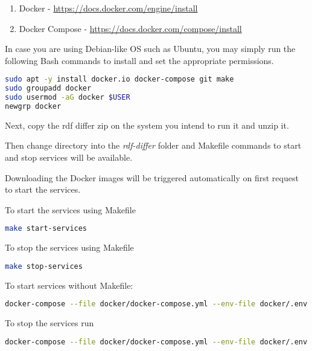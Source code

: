 \begin{enumerate}
	\item Docker - \url{https://docs.docker.com/engine/install}
	\item Docker Compose - \url{https://docs.docker.com/compose/install}
\end{enumerate}

In case you are using Debian-like OS such as Ubuntu, you may simply run the following Bash commands to install and set the appropriate permissions. 

\begin{lstlisting}[language=bash,]
sudo apt -y install docker.io docker-compose git make
sudo groupadd docker
sudo usermod -aG docker $USER
newgrp docker
	\end{lstlisting}

Next, copy the rdf differ zip on the system you intend to run it and unzip it.

Then change directory into the \textit{rdf-differ} folder and Makefile commands to start and stop services will be available. 	

Downloading the Docker images will be triggered automatically on first request to start the services. 

To start the services using Makefile

\begin{lstlisting}[language=bash,]
make start-services
\end{lstlisting}

To stop the services using Makefile

\begin{lstlisting}[language=bash,]
make stop-services
\end{lstlisting}

To start services without Makefile:

\begin{lstlisting}[language=bash,]
docker-compose --file docker/docker-compose.yml --env-file docker/.env up -d
\end{lstlisting}

To stop the services run

\begin{lstlisting}[language=bash,]
docker-compose --file docker/docker-compose.yml --env-file docker/.env down
\end{lstlisting}


